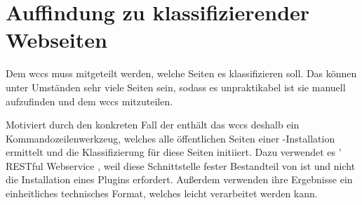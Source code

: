 \section{Auffindung zu klassifizierender Webseiten}
    \label{section:conceptCrawler}
    Dem \gls{wccs} muss mitgeteilt werden, welche Seiten es klassifizieren soll.
    Das können unter Umständen sehr viele Seiten sein,
    sodass es unpraktikabel ist sie manuell aufzufinden
    und dem \gls{wccs} mitzuteilen.

    Motiviert durch den konkreten Fall der {\fernUni} enthält das \gls{wccs}
    deshalb ein Kommandozeilenwerkzeug, welches alle öffentlichen Seiten einer
    {\wordpress}-Installation ermittelt und die Klassifizierung für diese Seiten initiiert.
    Dazu verwendet es {\wordpress}' RESTful Webservice \cite{wordpress:RestAPI},
    weil diese Schnittstelle fester Bestandteil von {\wordpress} ist und nicht die
    Installation eines Plugins erfordert.
    Außerdem verwenden ihre Ergebnisse ein einheitliches technisches Format,
    welches leicht verarbeitet werden kann.
